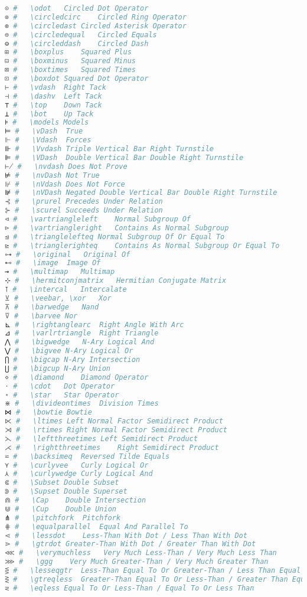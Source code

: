 \begin{lstlisting}[language=Julia, style=julia, linewidth=\textwidth]
⊙ #   \odot   Circled Dot Operator
⊚ #   \circledcirc    Circled Ring Operator
⊛ #   \circledast Circled Asterisk Operator
⊜ #   \circledequal   Circled Equals
⊝ #   \circleddash    Circled Dash
⊞ #   \boxplus    Squared Plus
⊟ #   \boxminus   Squared Minus
⊠ #   \boxtimes   Squared Times
⊡ #   \boxdot Squared Dot Operator
⊢ #   \vdash  Right Tack
⊣ #   \dashv  Left Tack
⊤ #   \top    Down Tack
⊥ #   \bot    Up Tack
⊧ #   \models Models
⊨ #   \vDash  True
⊩ #   \Vdash  Forces
⊪ #   \Vvdash Triple Vertical Bar Right Turnstile
⊫ #   \VDash  Double Vertical Bar Double Right Turnstile
⊬ #   \nvdash Does Not Prove
⊭ #   \nvDash Not True
⊮ #   \nVdash Does Not Force
⊯ #   \nVDash Negated Double Vertical Bar Double Right Turnstile
⊰ #   \prurel Precedes Under Relation
⊱ #   \scurel Succeeds Under Relation
⊲ #   \vartriangleleft    Normal Subgroup Of
⊳ #   \vartriangleright   Contains As Normal Subgroup
⊴ #   \trianglelefteq Normal Subgroup Of Or Equal To
⊵ #   \trianglerighteq    Contains As Normal Subgroup Or Equal To
⊶ #   \original   Original Of
⊷ #   \image  Image Of
⊸ #   \multimap   Multimap
⊹ #   \hermitconjmatrix   Hermitian Conjugate Matrix
⊺ #   \intercal   Intercalate
⊻ #   \veebar, \xor   Xor
⊼ #   \barwedge   Nand
⊽ #   \barvee Nor
⊾ #   \rightanglearc  Right Angle With Arc
⊿ #   \varlrtriangle  Right Triangle
⋀ #   \bigwedge   N-Ary Logical And
⋁ #   \bigvee N-Ary Logical Or
⋂ #   \bigcap N-Ary Intersection
⋃ #   \bigcup N-Ary Union
⋄ #   \diamond    Diamond Operator
⋅ #   \cdot   Dot Operator
⋆ #   \star   Star Operator
⋇ #   \divideontimes  Division Times
⋈ #   \bowtie Bowtie
⋉ #   \ltimes Left Normal Factor Semidirect Product
⋊ #   \rtimes Right Normal Factor Semidirect Product
⋋ #   \leftthreetimes Left Semidirect Product
⋌ #   \rightthreetimes    Right Semidirect Product
⋍ #   \backsimeq  Reversed Tilde Equals
⋎ #   \curlyvee   Curly Logical Or
⋏ #   \curlywedge Curly Logical And
⋐ #   \Subset Double Subset
⋑ #   \Supset Double Superset
⋒ #   \Cap    Double Intersection
⋓ #   \Cup    Double Union
⋔ #   \pitchfork  Pitchfork
⋕ #   \equalparallel  Equal And Parallel To
⋖ #   \lessdot    Less-Than With Dot / Less Than With Dot
⋗ #   \gtrdot Greater-Than With Dot / Greater Than With Dot
⋘ #   \verymuchless   Very Much Less-Than / Very Much Less Than
⋙ #   \ggg    Very Much Greater-Than / Very Much Greater Than
⋚ #   \lesseqgtr  Less-Than Equal To Or Greater-Than / Less Than Equal To Or Greater Than
⋛ #   \gtreqless  Greater-Than Equal To Or Less-Than / Greater Than Equal To Or Less Than
⋜ #   \eqless Equal To Or Less-Than / Equal To Or Less Than

\end{lstlisting}
